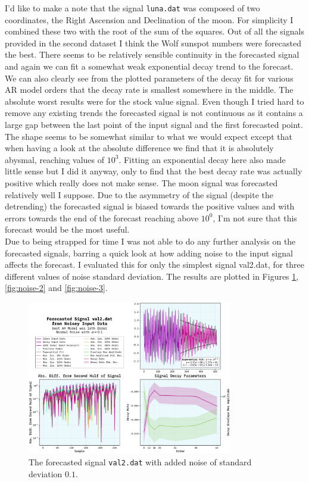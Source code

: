 \documentclass[10pt, titlepage, a4paper]{article}
\begin{document}
I'd like to make a note that the signal \texttt{luna.dat} was composed of two coordinates, the Right Ascension and
Declination of the moon. For simplicity I combined these two with the root of the sum of the squares. Out of all the 
signals provided in the second dataset I think the Wolf sunspot numbers were forecasted the best. There seems to be relatively
sensible continuity in the forecasted signal and again we can fit a somewhat weak exponential decay trend to the forecast. We can also 
clearly see from the plotted parameters of the decay fit for various AR model orders that the decay rate is smallest somewhere in the 
middle. The absolute worst results were for the stock value signal. Even though I tried hard to remove any existing trends 
the forecasted signal is not continuous as it contains a large gap between the last point of the input signal and the first forecasted 
point. The shape seems to be somewhat similar to what we would expect except that when having a look at the absolute difference 
we find that it is absolutely abysmal, reaching values of $10^3$. Fitting an exponential decay here also made little sense but 
I did it anyway, only to find that the best decay rate was actually positive which really does not make sense. The moon signal 
was forecasted relatively well I suppose. Due to the asymmetry of the signal (despite the detrending) the forecasted signal 
is biased towards the positive values and with errors towards the end of the forecast reaching above $10^0$, I'm not sure 
that this forecast would be the most useful. \\

Due to being strapped for time I was not able to do any further analysis on the forecasted signals, barring a quick look at how 
adding noise to the input signal affects the forecast. I evaluated this for only the simplest signal {val2.dat}, for three different 
values of noise standard deviation. The results are plotted in Figures \ref{fig:noise-1}, \ref{fig:noise-2} and \ref{fig:noise-3}.

\begin{figure}[H]
    \centering
    \includegraphics[width=0.8\textwidth]{../LinForecast/Images/noisey-forecast-val2.dat-0.1.pdf}
    \caption{The forecasted signal \texttt{val2.dat} with added noise of standard deviation $0.1$.}
    \label{fig:noise-1}
\end{figure}
\end{document}
